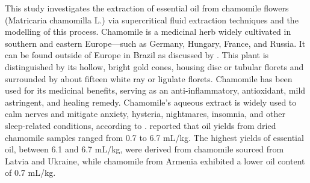 \documentclass[../Article_Model_Parameters.tex]{subfiles}
\begin{document}
	
	This study investigates the extraction of essential oil from chamomile flowers (Matricaria chamomilla L.) via supercritical fluid extraction techniques and the modelling of this process. Chamomile is a medicinal herb widely cultivated in southern and eastern Europe—such as Germany, Hungary, France, and Russia. It can be found outside of Europe in Brazil as discussed by \citet{Singh2011}. This plant is distinguished by its hollow, bright gold cones, housing disc or tubular florets and surrounded by about fifteen white ray or ligulate florets. Chamomile has been used for its medicinal benefits, serving as an anti-inflammatory, antioxidant, mild astringent, and healing remedy. Chamomile's aqueous extract is widely used to calm nerves and mitigate anxiety, hysteria, nightmares, insomnia, and other sleep-related conditions, according to \citet{Srivastava2009}. \citet{Orav2010} reported that oil yields from dried chamomile samples ranged from 0.7 to 6.7 mL/kg. The highest yields of essential oil, between 6.1 and 6.7 mL/kg, were derived from chamomile sourced from Latvia and Ukraine, while chamomile from Armenia exhibited a lower oil content of 0.7 mL/kg.
	
	
	
\end{document}

